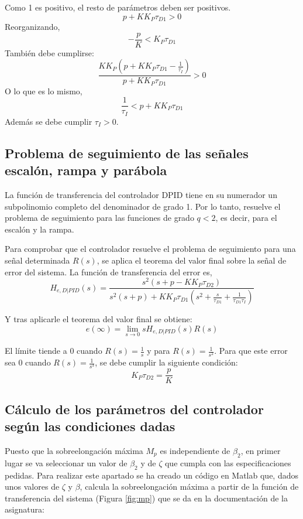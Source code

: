 \documentclass[a4paper]{article}
\begin{document}
Como 1 es positivo, el resto de parámetros deben ser positivos.
\begin{equation}
	p+K K_P \tau_{D1}>0
\end{equation}
Reorganizando,
\begin{equation}
	-\frac{p}{K}<K_P \tau_{D1}
	\label{eq:2}
\end{equation}
También debe cumplirse:
\begin{equation}
	\frac{K K_P (p+K K_P \tau_{D1} -\frac{1}{\tau_I})}{p+K K_P \tau_{D1}} > 0
\end{equation}
O lo que es lo mismo,
\begin{equation}
	\frac{1}{\tau_I} < p+K K_P \tau_{D1}
	\label{eq:3}
\end{equation}
Además se debe cumplir $\tau_I > 0$.

\subsection{Problema de seguimiento de las señales escalón, rampa y parábola}
La función de transferencia del controlador D\textbar PID tiene en su numerador un subpolinomio completo del denominador de grado 1. Por lo tanto, resuelve el problema de seguimiento para las funciones de grado $q<2$, es decir, para el escalón y la rampa.

Para comprobar que el controlador resuelve el problema de seguimiento para una señal determinada $R(s)$, se aplica el teorema del valor final sobre la señal de error del sistema.
La función de transferencia del error es,
\begin{equation}
	H_{e, D|PID}(s)=\frac{s^2(s+p-K K_P \tau_{D2})}{s^2(s+p)+K K_P \tau_{D1}(s^2+\frac{s}{\tau_{D1}}+\frac{1}{\tau_{D1} \tau_I})}
\end{equation}

Y tras aplicarle el teorema del valor final se obtiene:
\begin{equation}
	e(\infty)=\lim_{s \rightarrow 0}
	s H_{e, D|PID}(s) R(s)
\end{equation}

El límite tiende a 0 cuando $R(s)=\frac{1}{s}$ y para $R(s)=\frac{1}{s^2}$. Para que este error sea $0$ cuando $R(s)=\frac{1}{s^3}$, se debe cumplir la siguiente condición:
\begin{equation}
K_P \tau_{D2} = \frac{p}{K}
\end{equation}

\subsection{Cálculo de los parámetros del controlador según las condiciones dadas}
Puesto que la sobreelongación máxima $M_p$ es independiente de $\beta_2$, en primer lugar se va seleccionar un valor de $\beta_2$ y de $\zeta$ que cumpla con las especificaciones pedidas.
Para realizar este apartado se ha creado un código en Matlab que, dados unos valores de $\zeta$ y $\beta$, calcula la sobreelongación máxima a partir de la función de transferencia del sistema (Figura \ref{fig:mp}) que se da en la documentación de la asignatura:
\end{document}
